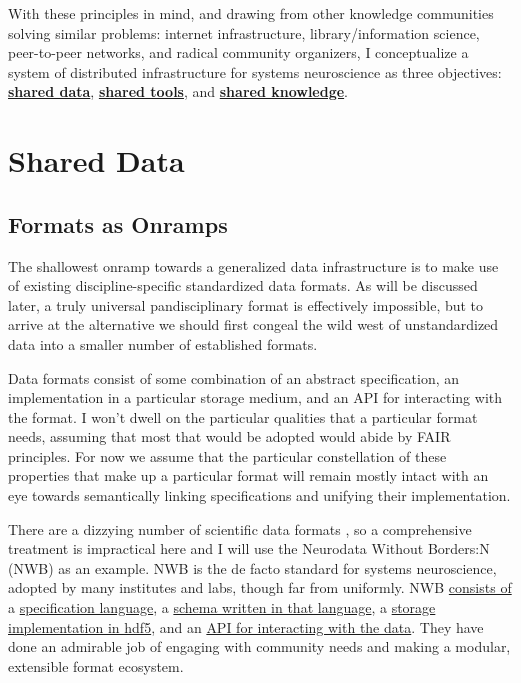 \documentclass[notoc]{tufte-book}
\begin{document}
With these principles in mind, and drawing from other knowledge
communities solving similar problems: internet infrastructure,
library/information science, peer-to-peer networks, and radical
community organizers, I conceptualize a system of distributed
infrastructure for systems neuroscience as three objectives:
\protect\hyperlink{shared-data}{\textbf{shared data}},
\protect\hyperlink{shared-tools}{\textbf{shared tools}}, and
\protect\hyperlink{shared-knowledge}{\textbf{shared knowledge}}.





\section{Shared Data}


\subsection{Formats as Onramps}



 The shallowest onramp towards a generalized data
infrastructure is to make use of existing discipline-specific
standardized data formats. As will be discussed later, a truly universal
pandisciplinary format is effectively impossible, but to arrive at the
alternative we should first congeal the wild west of unstandardized data
into a smaller number of established formats.

Data formats consist of some combination of an abstract specification,
an implementation in a particular storage medium, and an API for
interacting with the format. I won't dwell on the particular qualities
that a particular format needs, assuming that most that would be adopted
would abide by FAIR principles. For now we assume that the particular
constellation of these properties that make up a particular format will
remain mostly intact with an eye towards semantically linking
specifications and unifying their implementation.

There are a dizzying number of scientific data formats \citep{teamScientificDataFormats} , so a comprehensive treatment is
impractical here and I will use the Neurodata Without Borders:N
(NWB)\citep{rubelNWBAccessibleData2019a}  as an example. NWB is
the de facto standard for systems neuroscience, adopted by many
institutes and labs, though far from uniformly. NWB
\href{https://www.nwb.org/nwb-software/}{consists of} a
\href{https://schema-language.readthedocs.io/en/stable/}{specification
language}, a \href{https://nwb-schema.readthedocs.io/en/stable/}{schema
written in that language}, a
\href{https://nwb-storage.readthedocs.io/en/stable/}{storage
implementation in hdf5}, and an
\href{https://pynwb.readthedocs.io/en/stable/}{API for interacting with
the data}. They have done an admirable job of engaging with community
needs \citep{rubelNeurodataBordersEcosystem2021}  and making a
modular, extensible format ecosystem.
\end{document}

